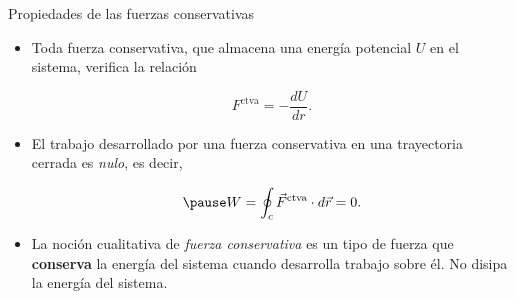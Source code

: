     \begin{frame}{Propiedades de las fuerzas conservativas}
    
        \begin{itemize}
        \pause \item Toda fuerza conservativa, que almacena una energía potencial $U$ en el sistema, verifica la relación
        
        \pause \begin{equation}
             F^{\text{ctva}}=-\frac{dU}{dr}.
        \end{equation}
        
        \pause \item El trabajo desarrollado por una fuerza conservativa en una trayectoria cerrada es \textit{nulo}, es decir,
        
        \begin{equation}
        \pause     W=\oint_c \vec{F}^{\text{ctva}}\cdot d\vec{r}=0.
        \end{equation}
        
        \pause \item La noción cualitativa de \textit{fuerza conservativa} es un tipo de fuerza que \textbf{conserva} la energía del sistema cuando desarrolla trabajo sobre él. No disipa la energía del sistema.
        
        \end{itemize}
        
    \end{frame}
    
    
